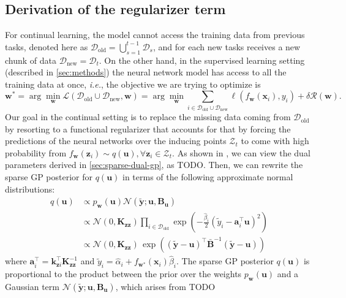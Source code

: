 \documentclass{article}
\makeatletter
\newcommand{\ie}{\textit{i.e.\@}\xspace}
\newcommand{\dataset}{\ensuremath{\mathcal{D}}}
\newcommand{\weights}{\ensuremath{\mathbf{w}}}
\newcommand{\mbf}[1]{\mathbf{#1}}
\newcommand{\MB}{\mbf{B}}
\newcommand{\vz}{\mbf{z}}
\newcommand{\vu}{\mbf{u}}
\newcommand{\vx}{\mbf{x}}
\newcommand{\vy}{\mbf{y}}
\newcommand{\vw}{\mbf{w}}
\newcommand{\va}{\mbf{a}}
\newcommand{\MKzz}{\mbf{K}_{\mbf{z}\mbf{z}}}
\newcommand{\vkzi}{\mbf{k}_{\mbf{z}i}}
\newcommand{\Norm}{\mathcal{N}}
\makeatother
\begin{document}
\subsection{Derivation of the regularizer term}
For continual learning, the model cannot access the training data from previous tasks, denoted here as $\dataset_\textrm{old} = \bigcup_{s=1}^{t-1} \dataset_s$, and for each new tasks receives a new chunk of data $\dataset_\textrm{new} = \dataset_t$. On the other hand, in the supervised learning setting (described in \cref{sec:methods}) the neural network model has access to all the training data at once, \ie, the objective we are trying to optimize is
\begin{equation}
	\weights^* = \arg \min_\weights \mathcal{L}(\dataset_\textrm{old} \cup \dataset_\textrm{new}, \weights) = \arg \min_\weights \sum_{i \in \dataset_\textrm{old} \cup \dataset_\textrm{new}}\ell(f_\weights(\mathbf{x}_{i}), y_i) + \delta \mathcal{R}(\weights).
\end{equation} 
Our goal in the continual setting is to replace the missing data coming from $\dataset_\textrm{old}$ by resorting to a functional regularizer that accounts for that by forcing the predictions of the neural networks over the inducing points $\mathcal{Z}_t$ to come with high probability from $f_\weights(\vz_i) \sim q(\vu),  \forall \vz_i \in \mathcal{Z}_t$. As shown in \citep{khan2017conjugate, adam2021dual}, we can view the dual parameters derived in \cref{sec:sparse-dual-gp}, as {\color{red} TODO}.  Then, we can rewrite the sparse GP posterior for $q(\vu)$ in terms of the following approximate normal distributions:
%
\begin{align}
	q(\vu)
	& \propto p_\weights(\vu) \Norm(\tilde{\vy}; \vu, \MB_\vu)\\
	& \propto  \Norm(0, \MKzz) \prod_{i \in \dataset_\textrm{old}} \exp \! \left(-\frac{\hat{\beta}_i}{2}(\tilde{y}_i - \va_i^\top \vu)^2 \right) \\
	& \propto \Norm(0, \MKzz) \, \exp\left((\tilde{\vy} - \vu)^\top \bar{\MB}^{-1}(\tilde{\vy} - \vu)\right)
\end{align}
where $\va_i^\top = \vkzi^\top \MKzz^{-1}$ and $\tilde{y}_i = \hat{\alpha}_i + f_{\vw^*}(\vx_i)\hat{\beta}_i$.
The sparse GP posterior $q(\vu)$ is proportional to the product between the prior over the weights $p_\weights(\vu)$ and a Gaussian term $\Norm(\tilde{\vy}; \vu, \MB_\vu)$, which arises from {\color{red} TODO}
 
\end{document}
